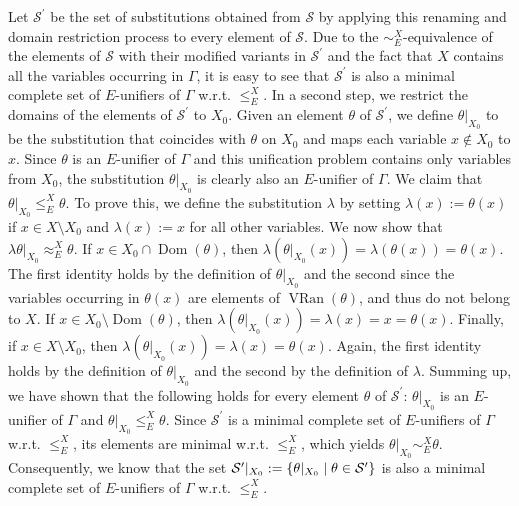 \documentclass[10pt,a4paper]{amsart}
\begin{document}
Let $\mathcal{S}^{\prime}$ be the set of substitutions obtained from $\mathcal{S}$ by applying this renaming and domain restriction process to every element of $\mathcal{S}$. Due to the $\sim_{E}^{X}$-equivalence of the elements of $\mathcal{S}$ with their modified variants in $\mathcal{S}^{\prime}$ and the fact that $X$ contains all the variables occurring in $\Gamma$, it is easy to see that $\mathcal{S}^{\prime}$ is also a minimal complete set of $E$-unifiers of $\Gamma$ w.r.t. $\leq_{E}^{X}$. In a second step, we restrict the domains of the elements of $\mathcal{S}^{\prime}$ to $X_{0}$. Given an element $\theta$ of $\mathcal{S}^{\prime}$, we define $\theta|_{X_{0}}$ to be the substitution that coincides with $\theta$ on $X_{0}$ and maps each variable $x\not\in X_{0}$ to $x$. Since $\theta$ is an $E$-unifier of $\Gamma$ and this unification problem contains only variables from $X_{0}$, the substitution $\theta|_{X_{0}}$ is clearly also an $E$-unifier of $\Gamma$. We claim that $\theta|_{X_{0}}\leq_{E}^{X}\theta$. To prove this, we define the substitution $\lambda$ by setting $\lambda(x):=\theta(x)$ if $x\in X\setminus X_{0}$ and $\lambda(x):=x$ for all other variables. We now show that $\lambda\theta|_{X_{0}}\approx_{E}^{X}\theta$. If $x\in X_{0}\cap\operatorname{Dom}(\theta)$, then $\lambda(\theta|_{X_{0}}(x))=\lambda(\theta(x))=\theta(x)$. The first identity holds by the definition of $\theta|_{X_{0}}$ and the second since the variables occurring in $\theta(x)$ are elements of $\operatorname{VRan}(\theta)$, and thus do not belong to $X$. If $x\in X_{0}\setminus\operatorname{Dom}(\theta)$, then $\lambda(\theta|_{X_{0}}(x))=\lambda(x)=x=\theta(x)$. Finally, if $x\in X\setminus X_{0}$, then $\lambda(\theta|_{X_{0}}(x))=\lambda(x)=\theta(x)$. Again, the first identity holds by the definition of $\theta|_{X_{0}}$ and the second by the definition of $\lambda$. Summing up, we have shown that the following holds for every element $\theta$ of $\mathcal{S}^{\prime}$: $\theta|_{X_{0}}$ is an $E$-unifier of $\Gamma$ and $\theta|_{X_{0}}\leq_{E}^{X}\theta$. Since $\mathcal{S}^{\prime}$ is a minimal complete set of $E$-unifiers of $\Gamma$ w.r.t. $\leq_{E}^{X}$, its elements are minimal w.r.t. $\leq_{E}^{X}$, which yields $\theta|_{X_{0}}\sim_{E}^{X}\theta$. Consequently, we know that the set $\mathcal{S}^{\prime}|_{X_{0}}:=\{\theta|_{X_{0}}\mid\theta\in\mathcal{S}^{%
\prime}\}$ is also a minimal complete set of $E$-unifiers of $\Gamma$ w.r.t. $\leq_{E}^{X}$.\par
 
 
\end{document}
